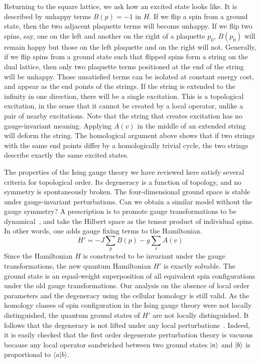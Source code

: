 Returning to the square lattice, we ask how an excited state looks like. It is described by unhappy terms $B(p) = -1$ in $H$. If we flip a spin from a ground state, then the two adjacent plaquette terms will become unhappy. If we flip two spins, say, one on the left and another on the right of a plaquette $p_0$, $B(p_0)$ will remain happy but those on the left plaquette and on the right will not. Generally, if we flip spins from a ground state such that flipped spins form a string on the dual lattice, then only two plaquette terms positioned at the end of the string will be unhappy. Those unsatisfied terms can be isolated at constant energy cost, and appear as the end points of the strings. If the string is extended to the infinity in one direction, there will be a single excitation. This is a topological excitation, in the sense that it cannot be created by a local operator, unlike a pair of nearby excitations. Note that the string that creates excitation has no gauge-invariant meaning. Applying $A(v)$ in the middle of an extended string will deform the string. The homological argument above shows that if two strings with the same end points differ by a homologically trivial cycle, the two strings describe exactly the same excited states.


The properties of the Ising gauge theory we have reviewed here
satisfy several criteria for topological order.
Its degeneracy is a function of topology, and no symmetry is spontaneously broken.
The four-dimensional ground space is stable under gauge-invariant perturbations.
Can we obtain a similar model without the gauge symmetry?
A prescription is to promote gauge transformations to be dynamical~\cite{Kitaev2003Fault-tolerant},
and take the Hilbert space as the tensor product of individual spins.
In other words, one adds gauge fixing terms to the Hamiltonian.
\begin{equation}
 H' = - J \sum_p B(p) - g \sum_v A(v)
\label{eq:H'}
\end{equation}
Since the Hamiltonian $H$ is constructed to be invariant under the gauge transformations, the new quantum Hamiltonian $H'$ is exactly solvable. The ground state is an equal-weight superposition of all equivalent spin configurations under the old gauge transformations. 
Our analysis on the absence of local order parameters and the degeneracy 
using the cellular homology is still valid. 
As the homology classes of spin configuration in the Ising gauge theory were not locally distinguished, 
the quantum ground states of $H'$ are not locally distinguished.
It follows that the degeneracy is not lifted under any local perturbations~\cite{BravyiHastingsMichalakis2010stability}.
Indeed, it is easily checked that the first order degenerate perturbation theory 
is vacuous because any local operator sandwiched between two ground states $\left| {a} \right\rangle$ and $\left| {b} \right\rangle$ 
is proportional to $\langle a | b \rangle$.

